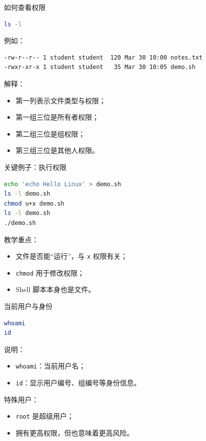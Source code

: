 \documentclass[aspectratio=169]{beamer}
\begin{document}
\begin{frame}[fragile]{如何查看权限}
\begin{lstlisting}[language=bash]
ls -l
\end{lstlisting}

例如：
\begin{lstlisting}[language=bash]
-rw-r--r-- 1 student student  120 Mar 30 10:00 notes.txt
-rwxr-xr-x 1 student student   35 Mar 30 10:05 demo.sh
\end{lstlisting}

解释：
\begin{itemize}
  \item 第一列表示文件类型与权限；
  \item 第一组三位是所有者权限；
  \item 第二组三位是组权限；
  \item 第三组三位是其他人权限。
\end{itemize}
\end{frame}

\begin{frame}[fragile]{关键例子：执行权限}
\begin{lstlisting}[language=bash]
echo 'echo Hello Linux' > demo.sh
ls -l demo.sh
chmod u+x demo.sh
ls -l demo.sh
./demo.sh
\end{lstlisting}

\vspace{0.5em}
教学重点：
\begin{itemize}
  \item 文件是否能“运行”，与 \texttt{x} 权限有关；
  \item \texttt{chmod} 用于修改权限；
  \item Shell 脚本本身也是文件。
\end{itemize}
\end{frame}

\begin{frame}[fragile]{当前用户与身份}
\begin{lstlisting}[language=bash]
whoami
id
\end{lstlisting}

\vspace{0.5em}
说明：
\begin{itemize}
  \item \texttt{whoami}：当前用户名；
  \item \texttt{id}：显示用户编号、组编号等身份信息。
\end{itemize}

\vspace{0.5em}
特殊用户：
\begin{itemize}
  \item \texttt{root} 是超级用户；
  \item 拥有更高权限，但也意味着更高风险。
\end{itemize}
\end{frame}
\end{document}
